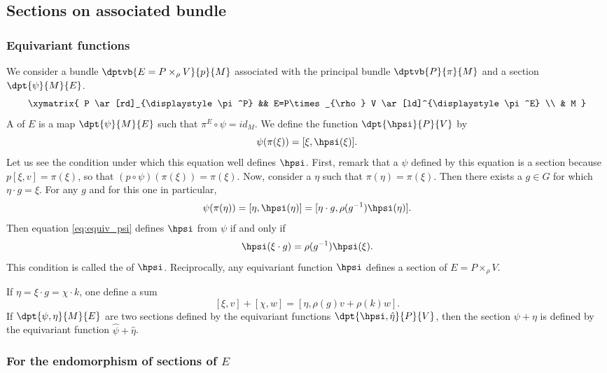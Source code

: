 \subsection{Sections on associated bundle}  \label{sec_fnequiv}

\subsubsection{Equivariant functions}

We consider a bundle $\dptvb{E=P\times_{\rho} V}{p}{M}$ associated with the principal bundle $\dptvb{P}{\pi}{M}$ and a section $\dpt{\psi}{M}{E}$.
\[
	\xymatrix{ P \ar[rd]_{\displaystyle\pi^P} &&
		E=P\times_{\rho} V \ar[ld]^{\displaystyle\pi^E} \\ & M }
\]
A  of $E$ is a map $\dpt{\psi}{M}{E}$ such that $\pi^E\circ\psi=id_M$. We define the function $\dpt{\hpsi}{P}{V}$ by
\begin{equation}\label{eq:equiv_psi}
	\psi(\pi(\xi))=[\xi,\hpsi(\xi)].
\end{equation}
Let us see the condition under which this equation well defines $\hpsi$. First, remark that a $\psi$ defined by this equation is a section because $p[\xi,v]=\pi(\xi)$, so that $(p\circ\psi)(\pi(\xi))=\pi(\xi)$. Now, consider a $\eta$ such that $\pi(\eta)=\pi(\xi)$. Then there exists a $g\in G$ for which $\eta\cdot g=\xi$. For any $g$ and for this one in particular,
\[
	\psi(\pi(\eta))=[\eta,\hpsi(\eta)]=[\eta\cdot g,\rho(g^{-1})\hpsi(\eta)].
\]
Then equation \eqref{eq:equiv_psi} defines $\hpsi$ from $\psi$ if and only if
\begin{equation}\label{eq:equiv_psi_b}
	\hpsi(\xi\cdot g)=\rho(g^{-1})\hpsi(\xi).
\end{equation}
This condition is called the  of $\hpsi$. Reciprocally, any equivariant function $\hpsi$ defines a section of $E=P\times_{\rho} V$.

If $\eta=\xi\cdot g=\chi\cdot k$, one define a sum
\begin{equation}\label{eq:def:som_E}
	[\xi,v]+[\chi,w]=[\eta,\rho(g)v+\rho(k)w].
\end{equation}
If $\dpt{\psi,\eta}{M}{E}$ are two sections defined by the equivariant functions $\dpt{\hpsi,\hat\eta}{P}{V}$, then the section $\psi+\eta$ is defined by the equivariant function $\hat\psi+\hat \eta$.

\subsubsection{For the endomorphism of sections of \texorpdfstring{$E$}{E}}\label{equivendo}

